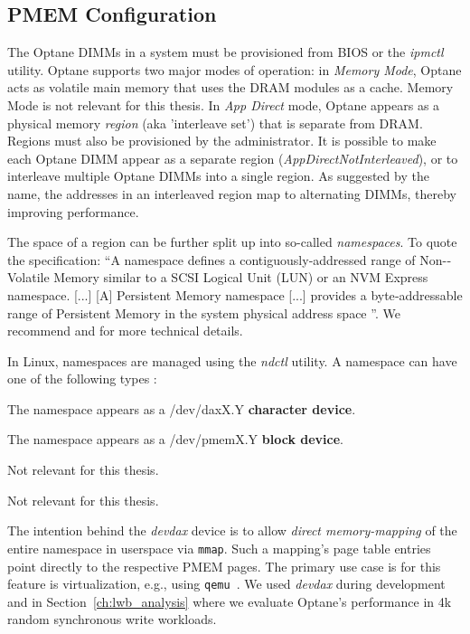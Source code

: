 \documentclass[12pt,a4paper,twoside]{book}
\begin{document}
\subsection{PMEM Configuration}\label{sec:background:pmemconfiguration}

The Optane DIMMs in a system must be provisioned from BIOS or the \textit{ipmctl} utility.
Optane supports two major modes of operation:
in \textit{Memory Mode}, Optane acts as volatile main memory that uses the DRAM modules as a cache. Memory Mode is not relevant for this thesis.
In \textit{App Direct} mode, Optane appears as a physical memory \textit{region} (aka 'interleave set') that is separate from DRAM. %
Regions must also be provisioned by the administrator.
It is possible to make each Optane DIMM appear as a separate region (\textit{AppDirectNotInterleaved}), or to interleave multiple Optane DIMMs into a single region.
As suggested by the name, the addresses in an interleaved region map to alternating DIMMs, thereby improving performance.

The space of a region can be further split up into so-called \textit{namespaces}.
To quote the specification:
``A	namespace defines a contiguously­‐addressed range of Non-­Volatile Memory similar to a SCSI Logical Unit (LUN) or an NVM Express \mbox{namespace}.
[...] [A] Persistent Memory namespace [...] provides a byte­‐addressable range of Persistent Memory in the system physical address space
''\cite{NVDIMMNamespaceSpecification2015}.
We recommend \cite{PmemIoConcepts} and \cite{NVDIMMNamespaceSpecification2015} for more technical details.

In Linux, namespaces are managed using the \textit{ndctl} utility.
A namespace can have one of the following types \cite{PmemIoConceptsNamespaces}:
\begin{description}[noitemsep,leftmargin=1.5cm,labelindent=1cm]
    \item[devdax] The namespace appears as a /dev/daxX.Y \textbf{character device}.
    \item[fsdax] The namespace appears as a /dev/pmemX.Y \textbf{block device}.
    \item[sector] Not relevant for this thesis.
    \item[raw] Not relevant for this thesis.
\end{description}

The intention behind the \textit{devdax} device is to allow \textit{direct memory-mapping} of the entire namespace in userspace via \lstinline{mmap}.
Such a mapping's page table entries point directly to the respective PMEM pages.
The primary use case is for this feature is virtualization, e.g., using \lstinline{qemu}~\cite{PmemIoUsingQemuVirtualization}.
We used \textit{devdax} during development and in Section~\ref{ch:lwb_analysis} where we evaluate Optane's performance in 4k random synchronous write workloads.
\end{document}
